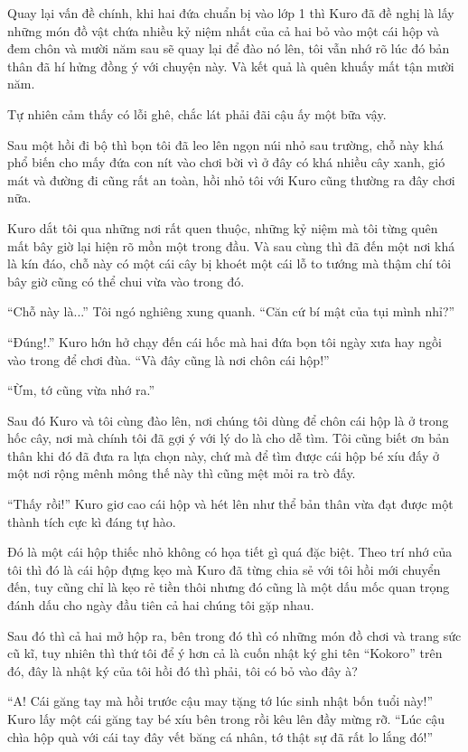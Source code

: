 {Quay lại vấn đề chính, khi hai đứa chuẩn bị vào lớp 1 thì Kuro đã đề
nghị là lấy những món đồ vật chứa nhiều kỷ niệm nhất của cả hai bỏ vào
một cái hộp và đem chôn và mười năm sau sẽ quay lại để đào nó lên, tôi
vẫn nhớ rõ lúc đó bản thân đã hí hửng đồng ý với chuyện này. Và kết quả
là quên khuấy mất tận mười năm.

Tự nhiên cảm thấy có lỗi ghê, chắc lát phải đãi cậu ấy một bữa vậy.

Sau một hồi đi bộ thì bọn tôi đã leo lên ngọn núi nhỏ sau trường, chỗ
này khá phổ biến cho mấy đứa con nít vào chơi bời vì ở đây có khá nhiều
cây xanh, gió mát và đường đi cũng rất an toàn, hồi nhỏ tôi với Kuro
cũng thường ra đây chơi nữa.

Kuro dắt tôi qua những nơi rất quen thuộc, những kỷ niệm mà tôi từng
quên mất bây giờ lại hiện rõ mồn một trong đầu. Và sau cùng thì đã đến
một nơi khá là kín đáo, chỗ này có một cái cây bị khoét một cái lỗ to
tướng mà thậm chí tôi bây giờ cũng có thể chui vừa vào trong đó.

``Chỗ này là...'' Tôi ngó nghiêng xung quanh. ``Căn cứ bí mật của tụi
mình nhỉ?''

``Đúng!.'' Kuro hớn hở chạy đến cái hốc mà hai đứa bọn tôi ngày xưa hay
ngồi vào trong để chơi đùa. ``Và đây cũng là nơi chôn cái hộp!''

``Ừm, tớ cũng vừa nhớ ra.''

Sau đó Kuro và tôi cùng đào lên, nơi chúng tôi dùng để chôn cái hộp là ở
trong hốc cây, nơi mà chính tôi đã gợi ý với lý do là cho dễ tìm. Tôi
cũng biết ơn bản thân khi đó đã đưa ra lựa chọn này, chứ mà để tìm được
cái hộp bé xíu đấy ở một nơi rộng mênh mông thế này thì cũng mệt mỏi ra
trò đấy.

``Thấy rồi!'' Kuro giơ cao cái hộp và hét lên như thể bản thân vừa đạt
được một thành tích cực kì đáng tự hào.

Đó là một cái hộp thiếc nhỏ không có họa tiết gì quá đặc biệt. Theo trí
nhớ của tôi thì đó là cái hộp đựng kẹo mà Kuro đã từng chia sẻ với tôi
hồi mới chuyển đến, tuy cũng chỉ là kẹo rẻ tiền thôi nhưng đó cũng là
một dấu mốc quan trọng đánh dấu cho ngày đầu tiên cả hai chúng tôi gặp
nhau.

Sau đó thì cả hai mở hộp ra, bên trong đó thì có những món đồ chơi và
trang sức cũ kĩ, tuy nhiên thì thứ tôi để ý hơn cả là cuốn nhật ký ghi
tên ``Kokoro'' trên đó, đây là nhật ký của tôi hồi đó thì phải, tôi có
bỏ vào đây à?

``A! Cái găng tay mà hồi trước cậu may tặng tớ lúc sinh nhật bốn tuổi
này!'' Kuro lấy một cái găng tay bé xíu bên trong rồi kêu lên đầy mừng
rỡ. ``Lúc cậu chìa hộp quà với cái tay đây vết băng cá nhân, tớ thật sự
đã rất lo lắng đó!''

}
